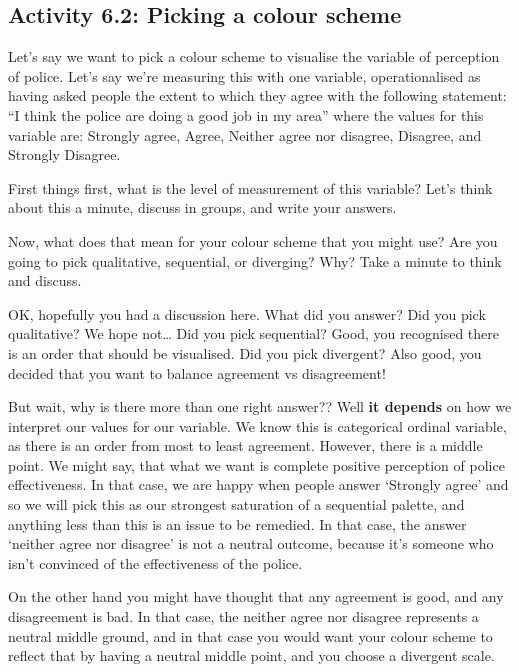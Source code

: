 \documentclass[
]{book}
\begin{document}
\hypertarget{activity-6.2-picking-a-colour-scheme}{%
\subsection{Activity 6.2: Picking a colour scheme}\label{activity-6.2-picking-a-colour-scheme}}

Let's say we want to pick a colour scheme to visualise the variable of perception of police. Let's say we're measuring this with one variable, operationalised as having asked people the extent to which they agree with the following statement: ``I think the police are doing a good job in my area'' where the values for this variable are: Strongly agree, Agree, Neither agree nor disagree, Disagree, and Strongly Disagree.

First things first, what is the level of measurement of this variable? Let's think about this a minute, discuss in groups, and write your answers.

Now, what does that mean for your colour scheme that you might use? Are you going to pick qualitative, sequential, or diverging? Why? Take a minute to think and discuss.

OK, hopefully you had a discussion here. What did you answer? Did you pick qualitative? We hope not\ldots{} Did you pick sequential? Good, you recognised there is an order that should be visualised. Did you pick divergent? Also good, you decided that you want to balance agreement vs disagreement!

But wait, why is there more than one right answer?? Well \textbf{it depends} on how we interpret our values for our variable. We know this is categorical ordinal variable, as there is an order from most to least agreement. However, there is a middle point. We might say, that what we want is complete positive perception of police effectiveness. In that case, we are happy when people answer `Strongly agree' and so we will pick this as our strongest saturation of a sequential palette, and anything less than this is an issue to be remedied. In that case, the answer `neither agree nor disagree' is not a neutral outcome, because it's someone who isn't convinced of the effectiveness of the police.

On the other hand you might have thought that any agreement is good, and any disagreement is bad. In that case, the neither agree nor disagree represents a neutral middle ground, and in that case you would want your colour scheme to reflect that by having a neutral middle point, and you choose a divergent scale.
\end{document}
